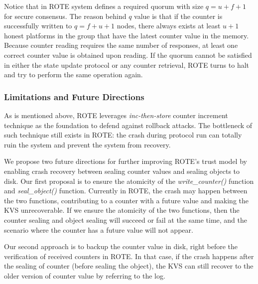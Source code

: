 Notice that in ROTE system defines a required quorum with size $q=u+f+1$ for secure consensus. The reason behind $q$ value is that if the counter is successfully written to $q = f + u + 1$ nodes, there always exists at least $u + 1$ honest platforms in the group that have the latest counter value in the memory. Because counter reading requires the same number of responses, at least one correct counter value is obtained upon reading. If the quorum cannot be satisfied in either the state update protocol or any counter retrieval, ROTE turns to halt and try to perform the same operation again.









\subsubsection{Limitations and Future Directions}

As is mentioned above, ROTE leverages \textit{inc-then-store} counter increment 
technique as the foundation to defend against rollback attacks. The bottleneck 
of such technique still exists in ROTE: the crash during protocol run can totally 
ruin the system and prevent the system from recovery. 

We propose two future directions for further improving ROTE's trust model by enabling 
crash recovery between sealing counter values and sealing objects to disk.
Our first proposal is to ensure the atomicity of the \textit{write\_counter()} function
and \textit{seal\_object()} function. Currently in ROTE, the crash may happen between the 
two functions, contributing to a counter with a future value and making the KVS unrecoverable.
If we ensure the atomicity of the two functions, then the counter sealing and object sealing 
will succeed or fail at the same time, and the scenario where the counter has a future value 
will not appear.

Our second approach is to backup the counter value in disk, right before the verification 
of received counters in ROTE. In that case, if the crash happens after the sealing of counter
(before sealing the object), the KVS can still recover to the older version of counter value 
by referring to the log.

